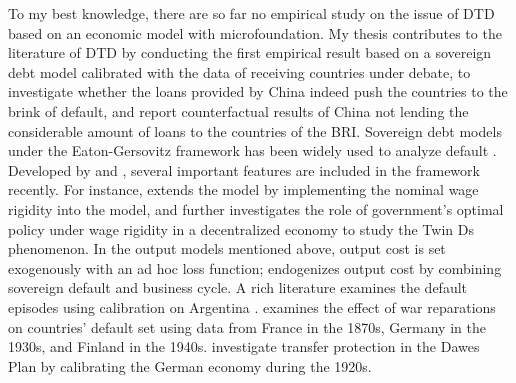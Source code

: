 To my best knowledge, there are so far no empirical study on the issue of DTD based on an economic model with microfoundation. My thesis contributes to the literature of DTD by conducting the first empirical result based on a sovereign debt model calibrated with the data of receiving countries under debate, to investigate whether the loans provided by China indeed push the countries to the brink of default, and report counterfactual results of China not lending the considerable amount of loans to the countries of the BRI.
Sovereign debt models under the Eaton-Gersovitz framework has been widely used to analyze default \citep*{Eaton-Gersovitz-81}.
Developed by \citet{Aguiar-Gopinath-06} and \citet{Arellano-08},
several important features are included in the framework recently.
For instance,
\citet{Schmitt-Uribe-16} extends the model by implementing the nominal wage rigidity into the model, and \citet{Na-18} further investigates the role of government's optimal policy under wage rigidity in a decentralized economy to study the Twin Ds phenomenon.
In the output models mentioned above, output cost is set exogenously with an ad hoc loss function; \citet*{Mendoza-Yue-12} endogenizes output cost by combining sovereign default and business cycle.
A rich literature examines the default episodes using calibration on Argentina \citep{Arellano-08, Schmitt-Uribe-16,Mendoza-Yue-12,Na-18}. \citet*{Hinrichsen_2020-chapter4} examines the effect of war reparations on countries' default set using data from France in the 1870s, Germany in the 1930s, and Finland in the 1940s. \citet*{Ho-Ritschl-23} investigate transfer protection in the Dawes Plan by calibrating the German economy during the 1920s.